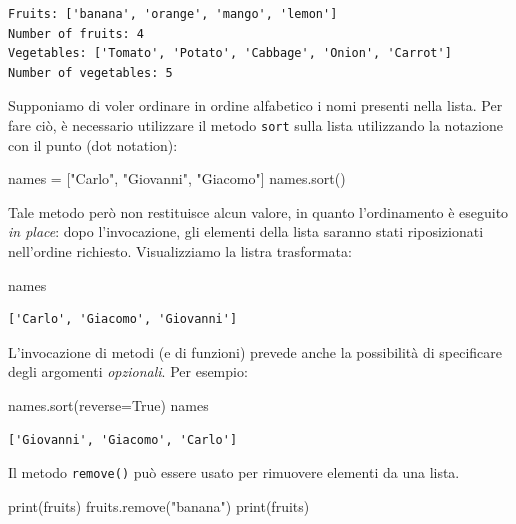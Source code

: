 \documentclass[
  letterpaper,
  krantz2]{{[}./krantz{]}}
\newenvironment{Shaded}{\begin{snugshade}}{\end{snugshade}}
\newcommand{\BuiltInTok}[1]{\textcolor[rgb]{0.00,0.23,0.31}{#1}}
\newcommand{\NormalTok}[1]{\textcolor[rgb]{0.00,0.23,0.31}{#1}}
\newcommand{\OperatorTok}[1]{\textcolor[rgb]{0.37,0.37,0.37}{#1}}
\newcommand{\StringTok}[1]{\textcolor[rgb]{0.13,0.47,0.30}{#1}}
\newcommand{\VariableTok}[1]{\textcolor[rgb]{0.07,0.07,0.07}{#1}}
\begin{document}
\begin{verbatim}
Fruits: ['banana', 'orange', 'mango', 'lemon']
Number of fruits: 4
Vegetables: ['Tomato', 'Potato', 'Cabbage', 'Onion', 'Carrot']
Number of vegetables: 5
\end{verbatim}

Supponiamo di voler ordinare in ordine alfabetico i nomi presenti nella
lista. Per fare ciò, è necessario utilizzare il metodo \texttt{sort}
sulla lista utilizzando la notazione con il punto (dot notation):

\begin{Shaded}
\begin{Highlighting}[]
\NormalTok{names }\OperatorTok{=}\NormalTok{ [}\StringTok{"Carlo"}\NormalTok{, }\StringTok{"Giovanni"}\NormalTok{, }\StringTok{"Giacomo"}\NormalTok{]}
\NormalTok{names.sort()}
\end{Highlighting}
\end{Shaded}

Tale metodo però non restituisce alcun valore, in quanto l'ordinamento è
eseguito \emph{in place}: dopo l'invocazione, gli elementi della lista
saranno stati riposizionati nell'ordine richiesto. Visualizziamo la
listra trasformata:

\begin{Shaded}
\begin{Highlighting}[]
\NormalTok{names}
\end{Highlighting}
\end{Shaded}

\begin{verbatim}
['Carlo', 'Giacomo', 'Giovanni']
\end{verbatim}

L'invocazione di metodi (e di funzioni) prevede anche la possibilità di
specificare degli argomenti \emph{opzionali}. Per esempio:

\begin{Shaded}
\begin{Highlighting}[]
\NormalTok{names.sort(reverse}\OperatorTok{=}\VariableTok{True}\NormalTok{)}
\NormalTok{names}
\end{Highlighting}
\end{Shaded}

\begin{verbatim}
['Giovanni', 'Giacomo', 'Carlo']
\end{verbatim}

Il metodo \texttt{remove()} può essere usato per rimuovere elementi da
una lista.

\begin{Shaded}
\begin{Highlighting}[]
\BuiltInTok{print}\NormalTok{(fruits)}
\NormalTok{fruits.remove(}\StringTok{"banana"}\NormalTok{)}
\BuiltInTok{print}\NormalTok{(fruits)}
\end{Highlighting}
\end{Shaded}
\end{document}
